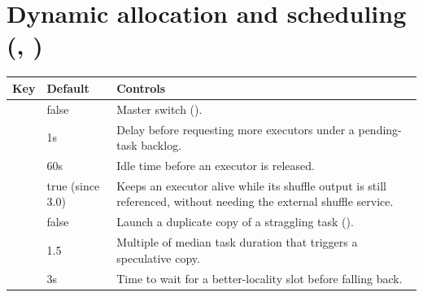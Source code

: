 \section{Dynamic allocation and scheduling (, )}

\begin{longtable}{@{}P{6.6cm}P{2.3cm}P{5.7cm}@{}}
\toprule
\textbf{Key} & \textbf{Default} & \textbf{Controls} \\
\midrule
\endhead
{} & false & Master switch
  (). \\
 & 1s & Delay before
  requesting more executors under a pending-task backlog. \\
 & 60s & Idle time before
  an executor is released. \\
 & true (since 3.0) &
  Keeps an executor alive while its shuffle output is still referenced,
  without needing the external shuffle service. \\
 & false & Launch a duplicate copy of a straggling
  task (). \\
 & 1.5 & Multiple of median task duration
  that triggers a speculative copy. \\
 & 3s & Time to wait for a better-locality slot
  before falling back. \\
\bottomrule
\end{longtable}

